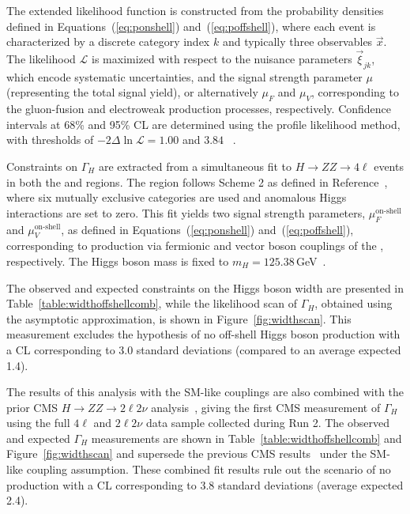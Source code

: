 The extended likelihood function is constructed from the probability densities defined in Equations~(\ref{eq:ponshell}) and~(\ref{eq:poffshell}), where each event is characterized by a discrete category index $k$ and typically three observables $\vec{x}$. The likelihood $\mathcal{L}$ is maximized with respect to the nuisance parameters $\vec{\xi}_{jk}$, which encode systematic uncertainties, and the signal strength parameter $\mu$ (representing the total signal yield), or alternatively $\mu_F$ and $\mu_V$, corresponding to the gluon-fusion and electroweak production processes, respectively. Confidence intervals at 68\% and 95\% CL are determined using the profile likelihood method, with thresholds of $-2\Delta\ln\mathcal{L} = 1.00$ and $3.84$ ~\cite{Wilks:1938dza}.

Constraints on $\Gamma_H$ are extracted from a simultaneous fit to $H \to ZZ \to 4\ell$ events in both the \onshell and \offshell regions. The \onshell region follows Scheme 2 as defined in Reference~\cite{CMS:2021nnc}, where six mutually exclusive categories are used and anomalous Higgs interactions are set to zero. This fit yields two signal strength parameters, $\mu^\text{on-shell}_{F}$ and $\mu^\text{on-shell}_{V}$, as defined in Equations~(\ref{eq:ponshell}) and~(\ref{eq:poffshell}), corresponding to production via fermionic and vector boson couplings of the \Hboson, respectively. The Higgs boson mass is fixed to $m_H = 125.38$\,GeV~\cite{Sirunyan:2020xwk}.

The observed and expected constraints on the Higgs boson width are presented in Table~\ref{table:widthoffshellcomb}, while the likelihood scan of $\Gamma_H$, obtained using the asymptotic approximation, is shown in Figure~\ref{fig:widthscan}. This measurement excludes the hypothesis of no off-shell Higgs boson production with a CL corresponding to 3.0 standard deviations (compared to an average expected 1.4).

The results of this analysis with the SM-like couplings are also combined with the prior CMS \offshell $H\to ZZ\to2\ell2\nu$ analysis~\cite{CMS:2022ley}, giving the first CMS measurement of $\Gamma_H$ using the full $4\ell$ and $2\ell2\nu$ data sample collected during Run 2. 
The observed and expected $\Gamma_H$ measurements are shown in Table~\ref{table:widthoffshellcomb} and Figure~\ref{fig:widthscan} and supersede the previous CMS results~\cite{CMS:2022ley} under the SM-like coupling assumption. These combined fit results rule out the scenario of no \offshell \Hboson production
with a CL corresponding to 3.8 standard deviations (average expected 2.4).

